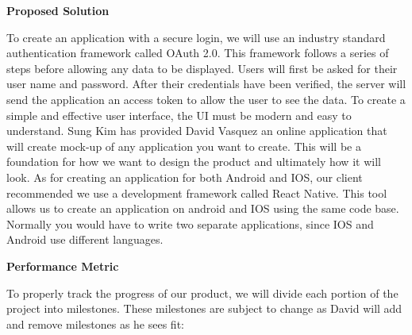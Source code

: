 \documentclass[10pt,letterpaper]{article}
\begin{document}
\begin{center}
\large
\textbf{Proposed Solution}
\end{center}

To create an application with a secure login, we will use an industry standard authentication framework called OAuth 2.0. This framework follows a series of steps before allowing any data to be displayed. Users will first be asked for their user name and password. After their credentials have been verified, the server will send the application an access token to allow the user to see the data. To create a simple and effective user interface, the UI must be modern and easy to understand. Sung Kim has provided David Vasquez an online application that will create mock-up of any application you want to create. This will be a foundation for how we want to design the product and ultimately how it will look. As for creating an application for both Android and IOS, our client recommended we use a development framework called React Native. This tool allows us to create an application on android and IOS using the same code base. Normally you would have to write two separate applications, since IOS and Android use different languages.\\

\begin{center}
\large
\textbf{Performance Metric}
\end{center}

To properly track the progress of our product, we will divide each portion of the project into milestones. These milestones are subject to change as David will add and remove milestones as he sees fit:
\end{document}
